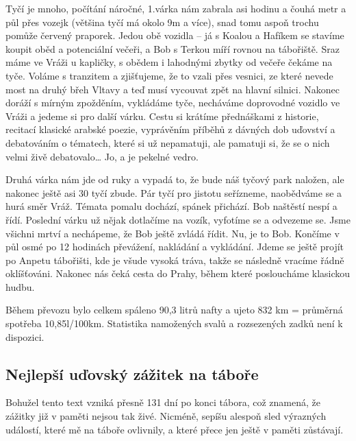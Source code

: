 Tyčí je mnoho, počítání náročné, 1.várka nám zabrala asi hodinu a čouhá metr a půl přes vozejk (většina tyčí má okolo 9m a více), snad tomu aspoň trochu pomůže červený praporek. Jedou obě vozidla – já s Koalou a Hafíkem se stavíme koupit oběd a potenciální večeři, a Bob s Terkou míří rovnou na tábořiště. Sraz máme ve Vráži u kapličky, s obědem i lahodnými zbytky od večeře čekáme na tyče. Voláme s tranzitem a zjišťujeme, že to vzali přes vesnici, ze které nevede most na druhý břeh Vltavy a teď musí vycouvat zpět na hlavní silnici. Nakonec doráží s mírným zpožděním, vykládáme tyče, necháváme doprovodné vozidlo ve Vráži a jedeme si pro další várku. Cestu si krátíme přednáškami z historie, recitací klasické arabské poezie, vyprávěním příběhů z dávných dob uďovství a debatováním o tématech, které si už nepamatuji, ale pamatuji si, že se o nich velmi živě debatovalo… Jo, a je pekelné vedro. 

Druhá várka nám jde od ruky a vypadá to, že bude náš tyčový park naložen, ale nakonec ještě asi 30 tyčí zbude. Pár tyčí pro jistotu seřízneme, naobědváme se a hurá směr Vráž. Témata pomalu dochází, spánek přichází. Bob naštěstí nespí a řídí. Poslední várku už nějak dotlačíme na vozík, vyfotíme se a odvezeme se. Jsme všichni mrtví a nechápeme, že Bob ještě zvládá řídit. Nu, je to Bob. Končíme v půl osmé po 12 hodinách převážení, nakládání a vykládání. Jdeme se ještě projít po Anpetu tábořišti, kde je všude vysoká tráva, takže se následně vracíme řádně oklíšťováni.
Nakonec nás čeká cesta do Prahy, během které posloucháme klasickou hudbu. 

Během převozu bylo celkem spáleno 90,3 litrů nafty a ujeto 832 km = průměrná spotřeba 10,85l/100km. Statistika namožených svalů a rozsezených zadků není k dispozici.




\subsection*{Nejlepší uďovský zážitek na táboře}
\label{sub:nejlepší_uďovský_zážitek_na_táboře}

Bohužel tento text vzniká přesně 131 dní po konci tábora, což znamená, že zážitky již v paměti nejsou tak živé. Nicméně, sepíšu alespoň sled výrazných událostí, které mě na táboře ovlivnily, a které přece jen ještě v paměti zůstávají.

